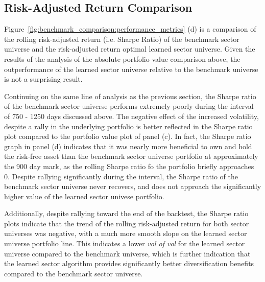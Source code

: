 \documentclass[../main.tex]{subfiles}
\begin{document}
\subsection{Risk-Adjusted Return Comparison}

Figure~\ref{fig:benchmark_comparison:performance_metrics} (d) is a comparison of the rolling risk-adjusted return (i.e. Sharpe Ratio) of the benchmark sector universe and the risk-adjusted return optimal learned sector universe. Given the results of the analysis of the absolute portfolio value comparison above, the outperformance of the learned sector universe relative to the benchmark universe is not a surprising result.

Continuing on the same line of analysis as the previous section, the Sharpe ratio of the benchmark sector universe performs extremely poorly during the interval of 750 - 1250 days discussed above. The negative effect of the increased volatility, despite a rally in the underlying portfolio is better reflected in the Sharpe ratio plot compared to the portfolio value plot of panel (c). In fact, the Sharpe ratio graph in panel (d) indicates that it was nearly more beneficial to own and hold the risk-free asset than the benchmark sector universe portfolio at approximately the 900 day mark, as the rolling Sharpe ratio fo the portfolio briefly approaches 0. Despite rallying significantly during the interval, the Sharpe ratio of the benchmark sector universe never recovers, and does not approach the significantly higher value of the learned sector univese portfolio.

Additionally, despite rallying toward the end of the backtest, the Sharpe ratio plots indicate that the trend of the rolling risk-adjusted return for both sector universes was negative, with a much more smooth slope on the learned sector universe portfolio line. This indicates a lower \textit{vol of vol} for the learned sector universe compared to the benchmark universe, which is further indication that the learned sector algorithm provides significantly better diversification benefits compared to the benchmark sector universe.


\end{document}
